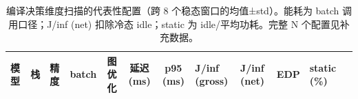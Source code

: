 \begin{table}[t]
  \centering
  \caption{编译决策维度扫描的代表性配置（跨 8 个稳态窗口的均值±std）。能耗为
    batch 调用口径；J/inf (net) 扣除冷态 idle；static 为 idle/平均功耗。完整
    N 个配置见补充数据。}
  \label{tab:scan-supplement}
  \renewcommand{\arraystretch}{1.25}
  \setlength{\tabcolsep}{3.5pt}
  \footnotesize
  \begin{tabular}{@{}lllcccclllll@{}}
    \toprule
    模型 & 栈 & 精度 & batch & 图优化 & 延迟 (ms) & p95 (ms) &
    J/inf (gross) & J/inf (net) & EDP & static (\%) \\
    \midrule
    \bottomrule
  \end{tabular}
\end{table}


